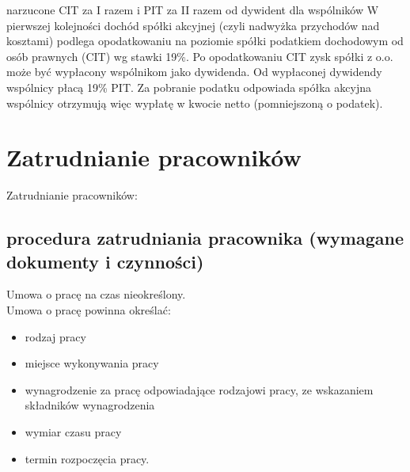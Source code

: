 \documentclass[a4paper, 11pt]{article}
\begin{document}
narzucone CIT  za I razem i PIT za II razem od dywident dla wspólników 
W pierwszej kolejności dochód spółki akcyjnej (czyli nadwyżka przychodów nad kosztami) podlega opodatkowaniu na poziomie spółki podatkiem dochodowym od osób prawnych (CIT) wg stawki 19\%. Po opodatkowaniu CIT zysk spółki z o.o. może być wypłacony wspólnikom jako dywidenda. Od wypłaconej dywidendy wspólnicy płacą 19\% PIT. Za pobranie podatku odpowiada spółka akcyjna wspólnicy otrzymują więc wypłatę w kwocie netto (pomniejszoną o podatek).
\section{Zatrudnianie pracowników}
Zatrudnianie pracowników:
\subsection{procedura zatrudniania pracownika (wymagane dokumenty i czynności)}

Umowa o pracę na czas nieokreślony.\\
Umowa o pracę powinna określać:
\begin{itemize}
\item rodzaj pracy
\item miejsce wykonywania pracy
\item wynagrodzenie za pracę odpowiadające rodzajowi pracy, ze wskazaniem składników wynagrodzenia
\item wymiar czasu pracy
\item termin rozpoczęcia pracy.
\end{itemize}
\end{document}
